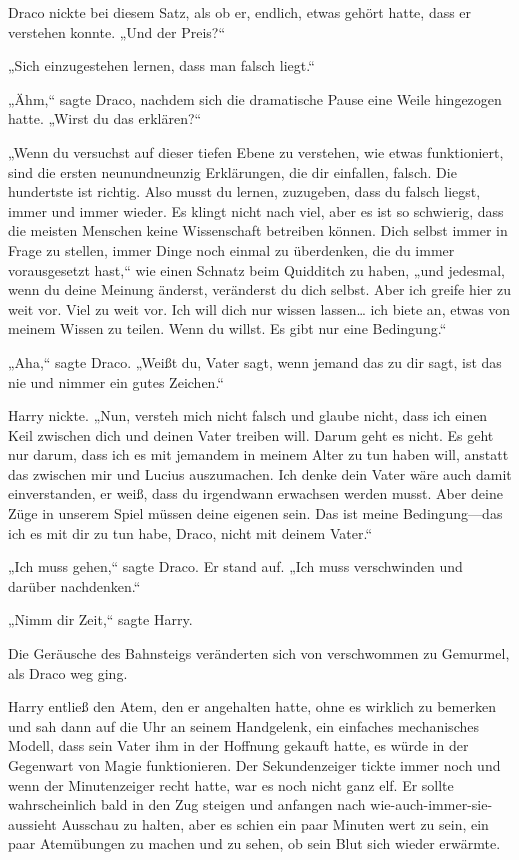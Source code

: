 {Draco nickte bei diesem Satz, als ob er, endlich, etwas gehört hatte, dass er verstehen konnte. „Und der Preis?“

„Sich einzugestehen lernen, dass man falsch liegt.“

„Ähm,“ sagte Draco, nachdem sich die dramatische Pause eine Weile hingezogen hatte. „Wirst du das erklären?“

„Wenn du versuchst auf dieser tiefen Ebene zu verstehen, wie etwas funktioniert, sind die ersten neunundneunzig Erklärungen, die dir einfallen, falsch. Die hundertste ist richtig. Also musst du lernen, zuzugeben, dass du falsch liegst, immer und immer wieder. Es klingt nicht nach viel, aber es ist so schwierig, dass die meisten Menschen keine Wissenschaft betreiben können. Dich selbst immer in Frage zu stellen, immer Dinge noch einmal zu überdenken, die du immer vorausgesetzt hast,“ wie einen Schnatz beim Quidditch zu haben, „und jedesmal, wenn du deine Meinung änderst, veränderst du dich selbst. Aber ich greife hier zu weit vor. Viel zu weit vor. Ich will dich nur wissen lassen… ich biete an, etwas von meinem Wissen zu teilen. Wenn du willst. Es gibt nur eine Bedingung.“

„Aha,“ sagte Draco. „Weißt du, Vater sagt, wenn jemand das zu dir sagt, ist das nie und nimmer ein gutes Zeichen.“

Harry nickte. „Nun, versteh mich nicht falsch und glaube nicht, dass ich einen Keil zwischen dich und deinen Vater treiben will. Darum geht es nicht. Es geht nur darum, dass ich es mit jemandem in meinem Alter zu tun haben will, anstatt das zwischen mir und Lucius auszumachen. Ich denke dein Vater wäre auch damit einverstanden, er weiß, dass du irgendwann erwachsen werden musst. Aber deine Züge in unserem Spiel müssen deine eigenen sein. Das ist meine Bedingung—das ich es mit dir zu tun habe, Draco, nicht mit deinem Vater.“

„Ich muss gehen,“ sagte Draco. Er stand auf. „Ich muss verschwinden und darüber nachdenken.“

„Nimm dir Zeit,“ sagte Harry.

Die Geräusche des Bahnsteigs veränderten sich von verschwommen zu Gemurmel, als Draco weg ging.

Harry entließ den Atem, den er angehalten hatte, ohne es wirklich zu bemerken und sah dann auf die Uhr an seinem Handgelenk, ein einfaches mechanisches Modell, dass sein Vater ihm in der Hoffnung gekauft hatte, es würde in der Gegenwart von Magie funktionieren. Der Sekundenzeiger tickte immer noch und wenn der Minutenzeiger recht hatte, war es noch nicht ganz elf. Er sollte wahrscheinlich bald in den Zug steigen und anfangen nach wie-auch-immer-sie-aussieht Ausschau zu halten, aber es schien ein paar Minuten wert zu sein, ein paar Atemübungen zu machen und zu sehen, ob sein Blut sich wieder erwärmte.

}
